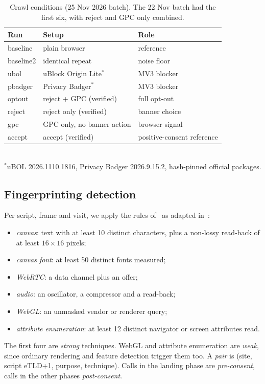 \documentclass[sigconf,review,anonymous]{acmart}
\begin{document}
\begin{table}[t]
\caption{Crawl conditions (25 Nov 2026 batch). The 22 Nov batch had the first six, with reject
and GPC only combined.}\label{tab:conditions}
\small
\begin{tabular}{@{}lll@{}}
\toprule
Run & Setup & Role \\
\midrule
baseline   & plain browser                    & reference \\
baseline2  & identical repeat                 & noise floor \\
ubol       & uBlock Origin Lite$^\ast$        & MV3 blocker \\
pbadger    & Privacy Badger$^\ast$            & MV3 blocker \\
optout     & reject + GPC (verified)          & full opt-out \\
reject     & reject only (verified)           & banner choice \\
gpc        & GPC only, no banner action       & browser signal \\
accept     & accept (verified)                & positive-consent reference \\
\bottomrule
\end{tabular}\\[2pt]
{\footnotesize $^\ast$uBOL 2026.1110.1816, Privacy Badger 2026.9.15.2, hash-pinned official packages.}
\end{table}

\subsection{Fingerprinting detection}
Per script, frame and visit, we apply the rules of~\cite{englehardt2016online} as adapted
in~\cite{iqbal2021fingerprinting}:
\begin{itemize}
\item \emph{canvas}: text with at least 10 distinct characters, plus a non-lossy read-back of at
  least $16\times16$ pixels;
\item \emph{canvas font}: at least 50 distinct fonts measured;
\item \emph{WebRTC}: a data channel plus an offer;
\item \emph{audio}: an oscillator, a compressor and a read-back;
\item \emph{WebGL}: an unmasked vendor or renderer query;
\item \emph{attribute enumeration}: at least 12 distinct navigator or screen attributes read.
\end{itemize}
The first four are \emph{strong} techniques. WebGL and attribute enumeration are \emph{weak},
since ordinary rendering and feature detection trigger them too. A \emph{pair} is
(site, script eTLD+1, purpose, technique). Calls in the landing phase are \emph{pre-consent},
calls in the other phases \emph{post-consent}.
\end{document}
